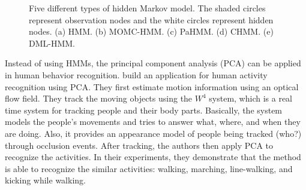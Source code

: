 \begin{figure}[t]
  \caption[Five different types of hidden Markov model]{Five different types of hidden Markov model. The shaded circles represent observation nodes and the white circles represent hidden nodes. 
  (a) HMM. 
  (b) MOMC-HMM. 
  (c) PaHMM. 
  (d) CHMM. 
  (e) DML-HMM.}
  \label{fig:all-hmms}
\end{figure}

Instead of using HMMs, the principal component analysis (PCA) can be
applied in human behavior recognition. 
build an application for human activity recognition using PCA. They
first estimate motion information using an optical flow field. They
track the moving objects using the $W^4$ system, which is a real time
system for tracking people and their body parts. Basically, the system
models the people's movements and tries to answer what, where, and
when they are doing. Also, it provides an appearance model of people
being tracked (who?) through occlusion events. After tracking, the
authors then apply PCA to recognize the activities. In their
experiments, they demonstrate that the method is able to recognize the
similar activities: walking, marching, line-walking, and kicking while
walking.


